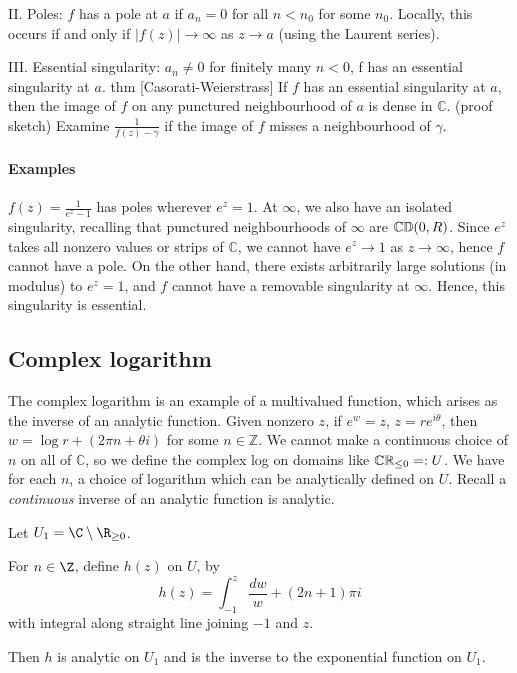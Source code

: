\documentclass{article}
\begin{document}
II. Poles: $f$ has a pole at $a$ if $a_n = 0$ for all $n < n_0$ for some $n_0$. Locally, this occurs if and only if $|f(z)| \to \infty$ as $z \to a$ (using the Laurent series).

III. Essential singularity: $a_n \neq 0$ for finitely many $n < 0$, f has an essential singularity at $a$.
thm [Casorati-Weierstrass] If $f$ has an essential singularity at $a$, then the image of $f$ on any punctured neighbourhood of $a$ is dense in $\mathbb{C}$.
(proof sketch) Examine $\frac1{f(z) - \gamma}$ if the image of $f$ misses a neighbourhood of $\gamma$.

\paragraph{Examples}
$f(z) = \frac1{e^z - 1}$ has poles wherever $e^z = 1$.
At $\infty$, we also have an isolated singularity, recalling that punctured neighbourhoods of $\infty$ are $\mathbb{C}\\ \mathbb{D}(0, R)$. Since $e^z$ takes all nonzero values or strips of $\mathbb{C}$, we cannot have $e^z \to 1$ as $z \to \infty$, hence $f$ cannot have a pole.  On the other hand, there exists arbitrarily large solutions (in modulus) to $e^z = 1$, and $f$ cannot have a removable singularity at $\infty$.  Hence, this singularity is essential.

\subsection{Complex logarithm}
The complex logarithm is an example of a multivalued function, which arises as the inverse of an analytic function. Given nonzero $z$, if $e^w = z$, $z = r e^{i \theta}$, then $w = \log r + (2 \pi n + \theta i)$ for some $n \in \mathbb{Z}$.  We cannot make a continuous choice of $n$ on all of $\mathbb{C}$, so we define the complex log on domains like $\mathbb{C} \\ \mathbb{R}_{\leq 0} =: U$. We have for each $n$, a choice of logarithm which can be analytically defined on $U$.  Recall a \emph{continuous} inverse of an analytic function is analytic.


Let $U_1 = \C \setminus \R_{\geq 0}$.

\begin{prop}
    For $n \in \Z$, define $h(z)$ on $U$, by
    \begin{equation*}
        h(z) = \int_{-1}^z \frac{dw}{w} + (2n+1) \pi i
    \end{equation*}
    with integral along straight line joining $-1$ and $z$.

    Then $h$ is analytic on $U_1$ and is the inverse to the exponential function on $U_1$.
\end{prop}
\end{document}
